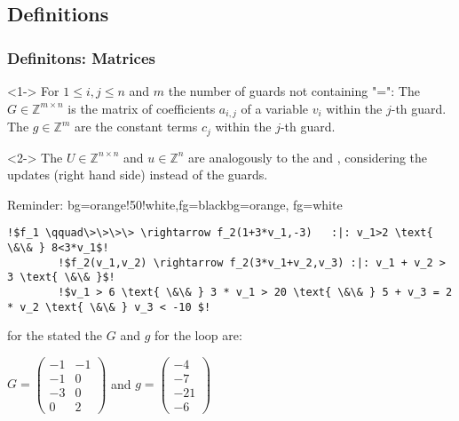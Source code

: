 \subsection{Definitions}

\begin{frame}
	\frametitle{Definitons: Matrices}
	\begin{definition}[\guardmatrix, \guardconstants]<1->
		For $1\le i,j\le n$ and $m$ the number of guards not containing "=":\newline
		The \guardmatrix $G\in \mathbb{Z}^{m\times n}$ is the matrix of coefficients $a_{i,j}$ of a variable $v_i$ within the $j$-th guard. The \guardconstants $g \in \mathbb{Z}^{m}$ are the constant terms $c_j$ within the $j$-th guard.
	\end{definition}
	\begin{definition}[\updatematrix, \updateconstants]<2->
		The \updatematrix $U \in \mathbb{Z}^{n \times n}$ and \updateconstants $u \in \mathbb{Z}^n$ are analogously to the \guardmatrix and \guardconstants , considering the updates (right hand side) instead of the guards.
	\end{definition}
\end{frame}

\begin{frame}[fragile]
	\begin{variableblock}{Reminder: \its}{bg=orange!50!white,fg=black}{bg=orange, fg=white}
		\begin{lstlisting}[linewidth=10.5cm, escapechar = !]
		!$f_1 \qquad\>\>\>\> \rightarrow f_2(1+3*v_1,-3)   :|: v_1>2 \text{ \&\& } 8<3*v_1$!
		!$f_2(v_1,v_2) \rightarrow f_2(3*v_1+v_2,v_3) :|: v_1 + v_2 > 3 \text{ \&\& }$! 
		!$v_1 > 6 \text{ \&\& } 3 * v_1 > 20 \text{ \&\& } 5 + v_3 = 2 * v_2 \text{ \&\& } v_3 < -10 $!
		\end{lstlisting}
	\end{variableblock}
	\begin{example}[\guardmatrix, \guardconstants]
		for the stated \its the \guardconstants $G$ and \guardconstants $g$ for the loop are:\newline
		\begin{center}
			\vspace{-2em}
			$G = \begin{pmatrix} -1 & -1 \\ -1 & 0 \\ -3 & 0 \\ 0 & 2 \end{pmatrix}$ and $g= \begin{pmatrix} -4 \\ -7 \\ -21 \\ -6 \end{pmatrix}$
		\end{center}		
	\end{example}
\end{frame}

